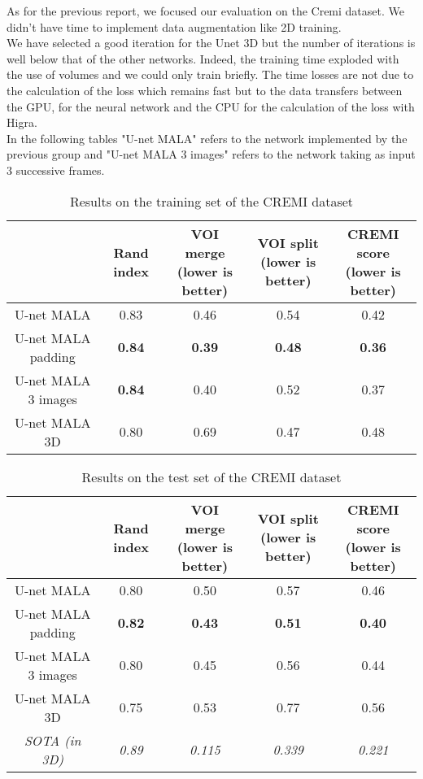 As for the previous report, we focused our evaluation on the Cremi dataset. We didn't have time to implement data augmentation like 2D training.\\
We have selected a good iteration for the Unet 3D but the number of iterations is well below that of the other networks. Indeed, the training time exploded with the use of volumes and we could only train briefly. The time losses are not due to the calculation of the loss which remains fast but to the data transfers between the GPU, for the neural network and the CPU for the calculation of the loss with Higra.\\

In the following tables "U-net MALA" refers to the network implemented by the previous group and "U-net MALA 3 images" refers to the network taking as input 3 successive frames.


\begin{table}[!htbp]
	\centering
	\begin{tabular}{|c|c|c|c|c|}
		\hline
		& Rand index & \thead{VOI merge \\(lower is better)} & \thead{VOI split\\(lower is better)} & \thead{CREMI score\\(lower is better)}\\
		\hline
		U-net MALA & 0.83 & 0.46 & 0.54 & 0.42\\
		\hline
		U-net MALA padding & \textbf{0.84} & \textbf{0.39} & \textbf{0.48} & \textbf{0.36}\\
		\hline
		U-net MALA 3 images & \textbf{0.84} & 0.40 & 0.52 & 0.37\\
		\hline
		U-net MALA 3D & 0.80 & 0.69 & 0.47 & 0.48\\
		\hline
	\end{tabular}
	\caption{Results on the training set of the CREMI dataset}
\label{tab:cremi_res_train}
\end{table}
\begin{table}[!htbp]
	\centering
	\begin{tabular}{|c|c|c|c|c|}
		\hline
		& Rand index & \thead{VOI merge \\(lower is better)} & \thead{VOI split\\(lower is better)} & \thead{CREMI score\\(lower is better)}\\
		\hline
		U-net MALA & 0.80 & 0.50 & 0.57 & 0.46\\
		\hline
		U-net MALA padding & \textbf{0.82} & \textbf{0.43} & \textbf{0.51} & \textbf{0.40}\\
		\hline
		U-net MALA 3 images & 0.80 & 0.45 & 0.56 & 0.44\\
		\hline
		U-net MALA 3D & 0.75 & 0.53 & 0.77 & 0.56\\
		\hline
		\hline
		\textit{SOTA (in 3D)} & \textit{0.89} & \textit{0.115} & \textit{0.339}& \textit{0.221}\\
		\hline
	\end{tabular}
	\caption{Results on the test set of the CREMI dataset}
\label{tab:cremi_res_test}
\end{table}

